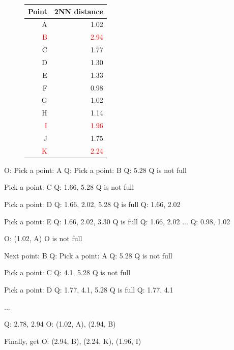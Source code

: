 \documentclass{article}
\begin{document}
\begin{figure}[H]
\begin{minipage}[T]{0.4\textwidth}
\begin {table}[H]
\begin{tabular}{|r|r|}
\hline
Point & 2NN distance \\ \hline
A & 1.02 \\ \hline
\textcolor{red}{B} & \textcolor{red}{2.94}  \\ \hline
C & 1.77 \\ \hline
D & 1.30 \\ \hline
E & 1.33  \\ \hline
F & 0.98 \\ \hline
G & 1.02 \\ \hline
H & 1.14 \\ \hline
\textcolor{red}{I} & \textcolor{red}{1.96} \\ \hline
J & 1.75 \\ \hline
\textcolor{red}{K} & \textcolor{red}{2.24} \\ \hline
\end{tabular}
\end{table}
\end{minipage}
\end{figure}

%
%


\begin{SQL}
O: { }
Pick a point: A
Q: { }
	Pick a point: B
	Q: {5.28}
	Q is not full

	Pick a point: C
	Q: {1.66, 5.28}
	Q is not full

	Pick a point: D
	Q: {1.66, 2.02, 5.28}
	Q is full
	Q: {1.66, 2.02}

	Pick a point: E
	Q: {1.66, 2.02, 3.30}
	Q is full
	Q: {1.66, 2.02}
	...
	Q: {0.98, 1.02}

O: {(1.02, A)}
O is not full

Next point: B
Q: { }
	Pick a point: A
	Q: {5.28}
	Q is not full

	Pick a point: C
	Q: {4.1, 5.28}
	Q is not full

	Pick a point: D
	Q: {1.77, 4.1, 5.28}
	Q is full
	Q: {1.77, 4.1}

	...

	Q: {2.78, 2.94}
O: {(1.02, A), (2.94, B)}

Finally, get
O: {(2.94, B), (2.24, K), (1.96, I)}

\end{SQL}
\end{document}

